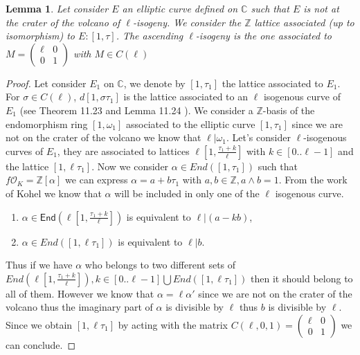\documentclass{article}
\theoremstyle{plain}
\newtheorem{lem}[thm]{Lemma}
\theoremstyle{definition}
\theoremstyle{remark}
\begin{document}
\begin{lem}
Let consider $E$ an elliptic curve defined on $\mathbb{C}$ such that $E$ is not at the crater of the volcano of $\ell$-isogeny. We consider the $\mathbb{Z}$ lattice associated (up to isomorphism) to $E:[1,\tau]$. The ascending $\ell$-isogeny is the one associated to $M=\left(\begin{array}{cc}
\ell & 0\\
0 & 1
\end{array}\right)$ with $M \in C(\ell)$
\end{lem}

\begin{proof}
Let consider $E_1$ on $\mathbb{C}$, we denote by $[1,\tau_1]$ the lattice associated to $E_1$. For $\sigma \in C(\ell)$, $d[1,\sigma \tau_1]$ is the lattice associated to an $\ell$ isogenous curve of $E_1$ (see Theorem 11.23 and Lemma 11.24 \cite{Cox89}).
\newline
We consider a $\mathbb{Z}$-basis of the endomorphism ring $[1,\omega_1]$ associated to the elliptic curve $[1,\tau_1]$ since we are not on the crater of the volcano we know that $\ell | \omega_1$. 
\newline
Let's consider $\ell$-isogenous curves of $E_1$, they are associated to lattices $\ell[1,\frac{\tau_1+k}{\ell}]$ with $k \in [0..\ell-1]$ and the lattice $[1,\ell \tau_1]$. Now we consider $\alpha \in End([1,\tau_1])$ such that $f\mathcal{O}_K=\mathbb{Z}[\alpha]$ we can express $\alpha = a + b \tau_1$ with $a,b \in \mathbb{Z}, a \wedge b =1$. From the work of Kohel \cite{Kohel96} we know that $\alpha$ will be included in only one of the $\ell$ isogenous curve. 
\begin{enumerate}
\item $\alpha \in \textsf{End}(\ell[1,\frac{\tau_1+k}{\ell}]) $ is equivalent to $\ell | (a-kb)$,
\item $\alpha \in End([1,\ell\tau_1]) $ is equivalent to $\ell | b$.
\end{enumerate}
 Thus if we have $\alpha $ who belongs to two different sets of ${ End(\ell[1,\frac{\tau_1+k}{\ell}]), k \in [0..\ell-1] \bigcup End([1,\ell\tau_1])}$ then it should belong to all of them. However we know that $\alpha = \ell \alpha'$ since we are not on the crater of the volcano thus the imaginary part of $\alpha$ is divisible by $\ell$ thus $b$ is divisible by $\ell$. 
\newline 
Since we obtain $[1,\ell \tau_1]$ by acting with the matrix $C(\ell,0,1)=\left(\begin{array}{cc}
\ell & 0\\
0 & 1
\end{array}\right)$ we can conclude.
\end{proof}
\end{document}
